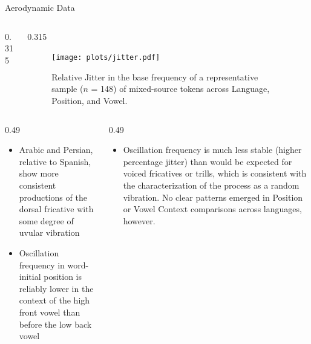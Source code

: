 \documentclass[final]{beamer}
\newlength{\twocolwid}
\begin{document}
\begin{frame}[t]
\begin{columns}[t]
\begin{column}{\twocolwid}
\begin{block}{Aerodynamic Data}
\begin{columns}[t,totalwidth=\twocolwid]
\begin{column}{0.315\twocolwid}
\end{column} %

\begin{column}{0.315\twocolwid} %

  \begin{figure}
    \texttt{[image: plots/jitter.pdf]}
    \caption{Relative Jitter in the base frequency of a representative sample ($n$ = 148) of mixed-source tokens across Language, Position, and Vowel.}
  \end{figure}

\end{column} %

\end{columns} %


\begin{columns}[t,totalwidth=\twocolwid] %

\begin{column}{0.49\twocolwid} %

\begin{itemize}
  \item Arabic and Persian, relative to Spanish, show more consistent productions of the dorsal fricative with some degree of uvular vibration
  \item Oscillation frequency in word-initial position is reliably lower in the context of the high front vowel  than before the low back vowel 
\end{itemize}

\end{column}

\begin{column}{0.49\twocolwid} %
  \begin{itemize}
    \item Oscillation frequency is much less stable (higher percentage jitter) than would be expected for voiced fricatives or trills, which is consistent with the characterization of the process as a random vibration. No clear patterns emerged in Position or Vowel Context comparisons across languages, however.
  \end{itemize}
\end{column}

\end{columns}

\end{block}




\end{column}
\end{columns}
\end{frame}
\end{document}
